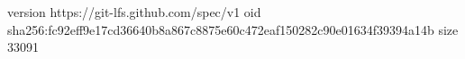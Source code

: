 version https://git-lfs.github.com/spec/v1
oid sha256:fc92eff9e17cd36640b8a867c8875e60c472eaf150282c90e01634f39394a14b
size 33091
